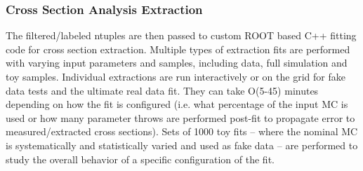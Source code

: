 \documentclass[../main-v1.tex]{subfiles}
\begin{document}
{\subsubsection{Cross Section Analysis Extraction}

The filtered/labeled ntuples are then passed to custom  ROOT based C++ fitting code for cross section extraction. Multiple types of extraction fits are performed with varying input parameters and samples, including data, full simulation and toy samples.  
Individual extractions are run interactively or on the grid for fake data tests and the ultimate real data fit. They can take O(5-45) minutes depending on how the fit is configured (i.e. what percentage of the input MC is used or how many parameter throws are performed post-fit to propagate error to measured/extracted cross sections). Sets of 1000 toy fits – where the nominal MC is systematically and statistically varied and used as fake data – are performed to study the overall behavior of a specific configuration of the fit.

}








\end{document}
